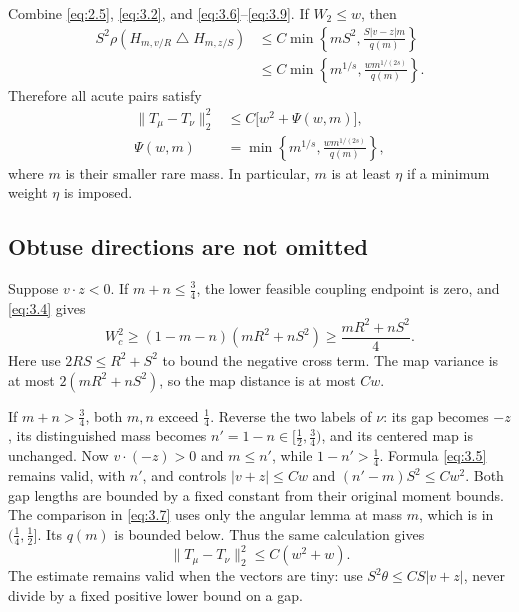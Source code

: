 Combine \eqref{eq:2.5}, \eqref{eq:3.2}, and \eqref{eq:3.6}--\eqref{eq:3.9}. If $W_2\le w$, then
\begin{equation}
  \begin{aligned}
  S^2\rho(H_{m,v/R}\mathbin{\triangle}H_{m,z/S})
  &\le C\min\!\left\{mS^2,\frac{S|v-z|m}{q(m)}\right\}\\
  &\le C\min\!\left\{m^{1/s},\frac{w m^{1/(2s)}}{q(m)}\right\}.
  \end{aligned}
  \tag{3.10}\label{eq:3.10}
\end{equation}
Therefore all acute pairs satisfy
\begin{equation}
  \begin{aligned}
  \|T_\mu-T_\nu\|_2^2&\le C\bigl[w^2+\Psi(w,m)\bigr],\\
  \Psi(w,m)&=\min\!\left\{m^{1/s},\frac{w m^{1/(2s)}}{q(m)}\right\},
  \end{aligned}
  \tag{3.11}\label{eq:3.11}
\end{equation}
where $m$ is their smaller rare mass. In particular, $m$ is at least $\eta$ if a minimum weight $\eta$ is imposed.

\subsection*{Obtuse directions are not omitted}

Suppose $v\cdot z<0$. If $m+n\le\tfrac34$, the lower feasible coupling endpoint is zero, and \eqref{eq:3.4} gives
\begin{equation}
  W_c^2\ge(1-m-n)(mR^2+nS^2)
    \ge\frac{mR^2+nS^2}{4}.
  \tag{3.12}\label{eq:3.12}
\end{equation}
Here use $2RS\le R^2+S^2$ to bound the negative cross term. The map variance is at most $2(mR^2+nS^2)$, so the map distance is at most $Cw$.

If $m+n>\tfrac34$, both $m,n$ exceed $\tfrac14$. Reverse the two labels of $\nu$: its gap becomes $-z$, its distinguished mass becomes $n'=1-n\in[\tfrac12,\tfrac34)$, and its centered map is unchanged. Now $v\cdot(-z)>0$ and $m\le n'$, while $1-n'>\tfrac14$. Formula \eqref{eq:3.5} remains valid, with $n'$, and controls $|v+z|\le Cw$ and $(n'-m)S^2\le Cw^2$. Both gap lengths are bounded by a fixed constant from their original moment bounds. The comparison in \eqref{eq:3.7} uses only the angular lemma at mass $m$, which is in $(\tfrac14,\tfrac12]$. Its $q(m)$ is bounded below. Thus the same calculation gives
\begin{equation}
  \|T_\mu-T_\nu\|_2^2\le C(w^2+w).
  \tag{3.13}\label{eq:3.13}
\end{equation}
The estimate remains valid when the vectors are tiny: use $S^2\theta\le CS|v+z|$, never divide by a fixed positive lower bound on a gap.

